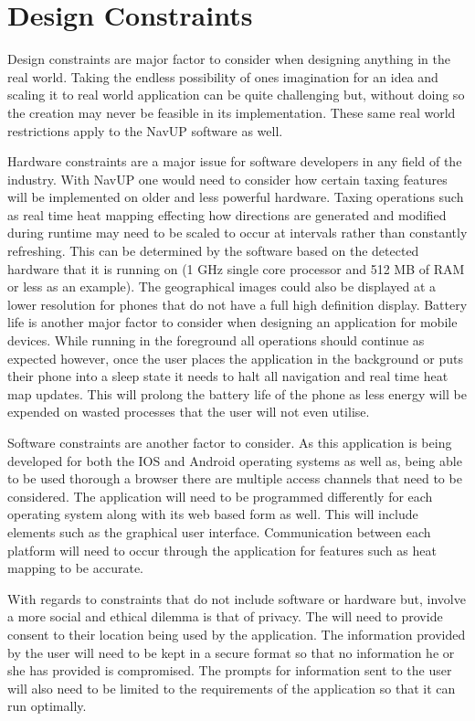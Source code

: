 \documentclass[11pt]{article}
\begin{document}
\section{Design Constraints}

Design constraints are major factor to consider when designing anything in the real world. Taking the endless possibility of ones imagination for an idea and scaling it to real world application can be quite challenging but, without doing so the creation may never be feasible in its implementation. These same real world restrictions apply to the NavUP software as well. 

Hardware constraints are a major issue for software developers in any field of the industry. With NavUP one would need to consider how certain taxing features will be implemented on older and less powerful hardware. Taxing operations such as real time heat mapping effecting how directions are generated and modified during runtime may need to be scaled to occur at intervals rather than constantly refreshing. This can be determined by the software based on the detected hardware that it is running on (1 GHz single core processor and 512 MB of RAM or less as an example). The geographical images could also be displayed at a lower resolution for phones that do not have a full high definition display. Battery life is another major factor to consider when designing an application for mobile devices. While running in the foreground all operations should continue as expected however, once the user places the application in the background or puts their phone into a sleep state it needs to halt all navigation and real time heat map updates. This will prolong the battery life of the phone as less energy will be expended on wasted processes that the user will not even utilise.

Software constraints are another factor to consider. As this application is being developed for both the IOS and Android operating systems as well as, being able to be used thorough a browser there are multiple access channels that need to be considered. The application will need to be programmed differently for each operating system along with its web based form as well. This will include elements such as the graphical user interface. Communication between each platform will need to occur through the application for features such as heat mapping to be accurate. 

With regards to constraints that do not include software or hardware but, involve a more social and ethical dilemma is that of privacy. The will need to provide consent to their location being used by the application. The information provided by the user will need to be kept in a secure format so that no information he or she has provided is compromised. The prompts for information sent to the user will also need to be limited to the requirements of the application so that it can run optimally. 
\end{document}

